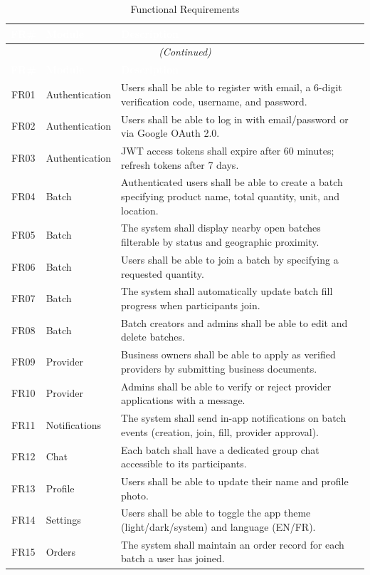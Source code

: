 \documentclass[12pt, a4paper]{report}
\begin{document}
\begin{longtable}{c p{3.5cm} p{8cm}}
\caption{Functional Requirements}\label{tab:func-req}\\
\toprule
\rowcolor{tablehead}
\textcolor{white}{\textbf{FR\#}} &
\textcolor{white}{\textbf{Module}} &
\textcolor{white}{\textbf{Description}}\\
\midrule
\endfirsthead
\multicolumn{3}{c}{\small\itshape (Continued)}\\
\toprule
\rowcolor{tablehead}
\textcolor{white}{\textbf{FR\#}} &
\textcolor{white}{\textbf{Module}} &
\textcolor{white}{\textbf{Description}}\\
\midrule
\endhead
\bottomrule
\endfoot
FR01 & Authentication  & Users shall be able to register with email, a 6-digit verification code, username, and password.\\
\rowcolor{batchitLight}
FR02 & Authentication  & Users shall be able to log in with email/password or via Google OAuth 2.0.\\
FR03 & Authentication  & JWT access tokens shall expire after 60 minutes; refresh tokens after 7 days.\\
\rowcolor{batchitLight}
FR04 & Batch           & Authenticated users shall be able to create a batch specifying product name, total quantity, unit, and location.\\
FR05 & Batch           & The system shall display nearby open batches filterable by status and geographic proximity.\\
\rowcolor{batchitLight}
FR06 & Batch           & Users shall be able to join a batch by specifying a requested quantity.\\
FR07 & Batch           & The system shall automatically update batch fill progress when participants join.\\
\rowcolor{batchitLight}
FR08 & Batch           & Batch creators and admins shall be able to edit and delete batches.\\
FR09 & Provider        & Business owners shall be able to apply as verified providers by submitting business documents.\\
\rowcolor{batchitLight}
FR10 & Provider        & Admins shall be able to verify or reject provider applications with a message.\\
FR11 & Notifications   & The system shall send in-app notifications on batch events (creation, join, fill, provider approval).\\
\rowcolor{batchitLight}
FR12 & Chat            & Each batch shall have a dedicated group chat accessible to its participants.\\
FR13 & Profile         & Users shall be able to update their name and profile photo.\\
\rowcolor{batchitLight}
FR14 & Settings        & Users shall be able to toggle the app theme (light/dark/system) and language (EN/FR).\\
FR15 & Orders          & The system shall maintain an order record for each batch a user has joined.\\
\end{longtable}
\end{document}
